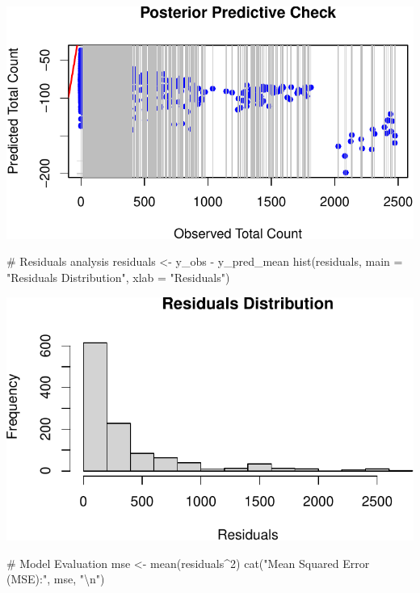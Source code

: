 \documentclass[
  12pt,
]{article}
\newenvironment{Shaded}{\begin{snugshade}}{\end{snugshade}}
\newcommand{\AttributeTok}[1]{\textcolor[rgb]{0.40,0.45,0.13}{#1}}
\newcommand{\CommentTok}[1]{\textcolor[rgb]{0.37,0.37,0.37}{#1}}
\newcommand{\DecValTok}[1]{\textcolor[rgb]{0.68,0.00,0.00}{#1}}
\newcommand{\FunctionTok}[1]{\textcolor[rgb]{0.28,0.35,0.67}{#1}}
\newcommand{\NormalTok}[1]{\textcolor[rgb]{0.00,0.23,0.31}{#1}}
\newcommand{\OtherTok}[1]{\textcolor[rgb]{0.00,0.23,0.31}{#1}}
\newcommand{\SpecialCharTok}[1]{\textcolor[rgb]{0.37,0.37,0.37}{#1}}
\newcommand{\StringTok}[1]{\textcolor[rgb]{0.13,0.47,0.30}{#1}}
\begin{document}
\includegraphics{final_main_quarto_presentation_files/figure-pdf/unnamed-chunk-27-1.pdf}

\begin{Shaded}
\begin{Highlighting}[]
\CommentTok{\# Residuals analysis}
\NormalTok{residuals }\OtherTok{\textless{}{-}}\NormalTok{ y\_obs }\SpecialCharTok{{-}}\NormalTok{ y\_pred\_mean}
\FunctionTok{hist}\NormalTok{(residuals, }\AttributeTok{main =} \StringTok{"Residuals Distribution"}\NormalTok{, }\AttributeTok{xlab =} \StringTok{"Residuals"}\NormalTok{)}
\end{Highlighting}
\end{Shaded}

\includegraphics{final_main_quarto_presentation_files/figure-pdf/unnamed-chunk-27-2.pdf}

\begin{Shaded}
\begin{Highlighting}[]
\CommentTok{\# Model Evaluation}
\NormalTok{mse }\OtherTok{\textless{}{-}} \FunctionTok{mean}\NormalTok{(residuals}\SpecialCharTok{\^{}}\DecValTok{2}\NormalTok{)}
\FunctionTok{cat}\NormalTok{(}\StringTok{"Mean Squared Error (MSE):"}\NormalTok{, mse, }\StringTok{"}\SpecialCharTok{\textbackslash{}n}\StringTok{"}\NormalTok{)}
\end{Highlighting}
\end{Shaded}
\end{document}
